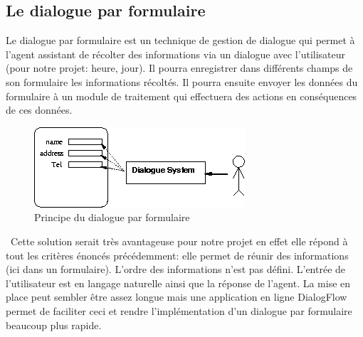 \subsection{Le dialogue par formulaire}
Le dialogue par formulaire est un technique de gestion de dialogue qui permet à l'agent assistant de récolter des informations via un dialogue avec l'utilisateur (pour notre projet: heure, jour). Il pourra enregistrer dans différents champs de son formulaire les informations récoltés. Il pourra ensuite envoyer les données du formulaire à un module de traitement qui effectuera des actions en conséquences de ces données.
\begin{figure}[H]
\centering
 \includegraphics[scale=0.5]{images/slot.png} %
 \caption{Principe du dialogue par formulaire}
\end{figure}\
Cette solution serait très avantageuse pour notre projet en effet elle répond à tout les critères énoncés précédemment: elle permet de réunir des informations (ici dans un formulaire). L'ordre des informations n'est pas défini. L'entrée de l'utilisateur est en langage naturelle ainsi que la réponse de l'agent. La mise en place peut sembler être assez longue mais une application en ligne DialogFlow permet de faciliter ceci et rendre l'implémentation d'un dialogue par formulaire beaucoup plus rapide.



